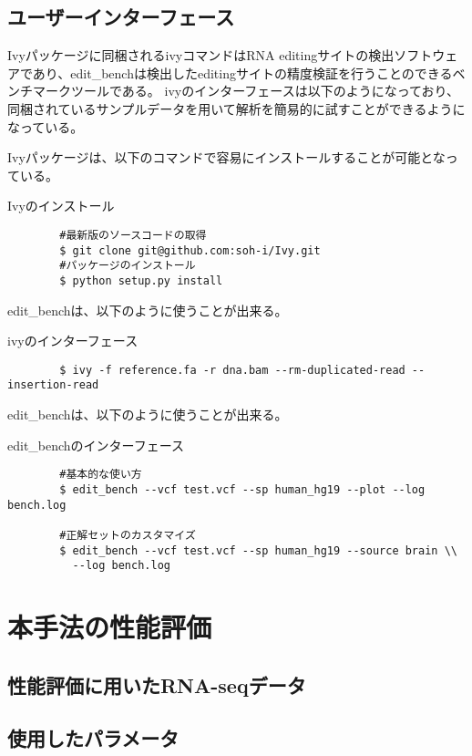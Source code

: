 \subsection{ユーザーインターフェース}
Ivyパッケージに同梱されるivyコマンドはRNA editingサイトの検出ソフトウェアであり、edit\_benchは検出したeditingサイトの精度検証を行うことのできるベンチマークツールである。
ivyのインターフェースは以下のようになっており、同梱されているサンプルデータを用いて解析を簡易的に試すことができるようになっている。
\par
Ivyパッケージは、以下のコマンドで容易にインストールすることが可能となっている。
\begin{itembox}[l]{Ivyのインストール}
	\begin{verbatim}
		#最新版のソースコードの取得
		$ git clone git@github.com:soh-i/Ivy.git 
		#パッケージのインストール
		$ python setup.py install
	\end{verbatim}
\end{itembox}

edit\_benchは、以下のように使うことが出来る。
\begin{itembox}[l]{ivyのインターフェース}
	\begin{verbatim}
		$ ivy -f reference.fa -r dna.bam --rm-duplicated-read --insertion-read
	\end{verbatim}
\end{itembox}

\par

edit\_benchは、以下のように使うことが出来る。

\begin{itembox}[l]{edit\_benchのインターフェース}
	\begin{verbatim}
		#基本的な使い方
		$ edit_bench --vcf test.vcf --sp human_hg19 --plot --log bench.log

		#正解セットのカスタマイズ
		$ edit_bench --vcf test.vcf --sp human_hg19 --source brain \\ 
		  --log bench.log
	\end{verbatim}
\end{itembox}

\section{本手法の性能評価}
\subsection{性能評価に用いたRNA-seqデータ}
\subsection{使用したパラメータ}
